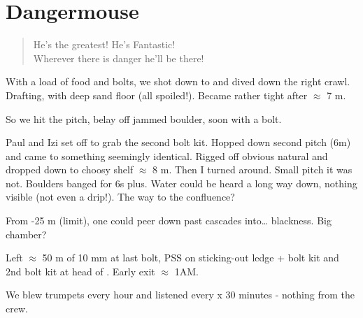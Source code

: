 \section{Dangermouse}


\begin{verse}
\note He's the greatest! He's Fantastic!\\
        Wherever there is danger he'll be there! \enote
\end{verse}



With a load of food and bolts, we shot down to  and dived down the right crawl. Drafting, with deep sand floor (all spoiled!). Became rather tight after $\approx$ 7 m.

So we hit the pitch, belay off jammed boulder, soon with a bolt.

Paul and Izi set off to grab the second bolt kit. Hopped down second pitch (6m) and came to something seemingly identical. Rigged off obvious natural and dropped down to choosy shelf $\approx$ 8 m. Then I turned around. Small pitch it was not. Boulders banged for 6s plus. Water could be heard a long way down, nothing visible (not even a drip!). The way to the  confluence?

From -25 m (limit), one could peer down past cascades into\ldots{} blackness. Big chamber?

Left $\approx$ 50 m of 10 mm at last bolt, PSS on sticking-out ledge + bolt kit and 2nd bolt kit at head of . Early exit $\approx$ 1AM.

We blew trumpets every hour and listened every x 30 minutes - nothing from the  crew.



